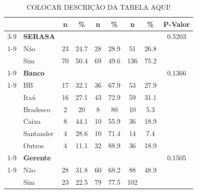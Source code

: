 \documentclass[]{article}
\begin{document}
\begin{table}[t!]
\begin{tabular}{c c c c c c c c c}
                && n & \% & n & \% & n & \% & P-Valor \\ \cmidrule{3-9}
                \multicolumn{1}{c}{\multirow{5}{*}}   &
                \multicolumn{1}{l}{\textbf{SERASA}} &  &  &  & & &  & 0.5203 \\ \cmidrule{1-9}
                \multicolumn{1}{c}{}    &
                \multicolumn{1}{l}{Não} & 23 & 24.7 & 28 & 28.9 & 51 & 26.8 &  \\
                \multicolumn{1}{c}{}    &
                \multicolumn{1}{l}{Sim}& 70 & 50.4 & 69 & 49.6 & 136 & 75.2  \\ \cmidrule{1-9} &
                \multicolumn{1}{l}{\textbf{Banco}}&  &  &  & & &  & 0.1366\\ \cmidrule{1-9}                
                \multicolumn{1}{c}{}    &
                \multicolumn{1}{l}{BB} & 17 & 32.1 & 36 & 67.9 & 53 & 27.9  \\
                \multicolumn{1}{c}{}    &   
                \multicolumn{1}{l}{Itaú} &16 & 27.1 & 43 & 72.9 & 59 & 31.1  \\
                \multicolumn{1}{c}{}    &
                \multicolumn{1}{l}{Bradesco} & 2 & 20 & 8 & 80 & 10 & 5.3 \\
                \multicolumn{1}{c}{}    &
                \multicolumn{1}{l}{Caixa} & 8 & 44.1 & 10 & 55.9 & 36 & 18.9  \\
                \multicolumn{1}{c}{}    &
                \multicolumn{1}{l}{Santander} & 4 & 28.6 & 10 & 71.4 & 14 & 7.4  \\
                \multicolumn{1}{c}{}    &
                \multicolumn{1}{l}{Outros} & 4 & 11.1 & 32 & 88.9  & 36 & 18.9\\ \cmidrule{1-9} &
                \multicolumn{1}{l}{\textbf{Gerente}} &   &  &  & & &  & 0.1505 \\ \cmidrule{1-9}
                \multicolumn{1}{c}{}    &
                \multicolumn{1}{l}{Não} & 28 & 31.8 & 60 & 68.2 & 88 & 48.9 &  \\
                \multicolumn{1}{c}{}    &
                \multicolumn{1}{l}{Sim}& 23 & 22.5 & 79 & 77.5 & 102  \\
                \midrule
                \bottomrule
        \end{tabular}
        \centering
        \caption{COLOCAR DESCRIÇÃO DA TABELA AQUI!}
        \label{table:tab1}
        \label{tab:sam_count}
\end{table}
\end{document}
